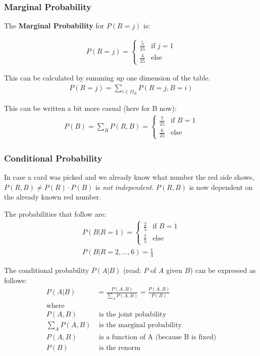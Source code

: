 \subsubsection*{Marginal Probability}
The \textbf{Marginal Probability} for $P(R=j)$ is:

\begin{align*}
P(R=j) = 
\begin{cases} 
\frac{5}{25} & \mbox{if } j = 1 \\ 
\frac{4}{25} & \mbox{else}
\end{cases}
\end{align*}

This can be calculated by summing up one dimension of the table.
\begin{align*}
P(R=j) = \sum\limits_{i \in \Omega_B} P(R=j, B=i)
\end{align*}

This can be written a bit more casual (here for B now):
\begin{align*}
P(B) = \sum\limits_R P(R, B) = 
\begin{cases} 
\frac{7}{25} & \mbox{if } B = 1 \\ 
\frac{6}{25} & \mbox{else}
\end{cases}
\end{align*}

\subsubsection*{Conditional Probability}
In case a card was picked and we already know what number the red side shows,
$P(R, B) \neq P(R) \cdot P(B)$ is \textit{not independent}. $P(R,B)$ is now dependent on the already known red number.

The probabilities that follow are:
\begin{align*}
P(B|R=1) =
\begin{cases} 
\frac{2}{5} & \mbox{if } B = 1 \\ 
\frac{1}{5} & \mbox{else}
\end{cases}\\
P(B|R=2, ..., 6) = \frac{1}{4}
\end{align*}

The conditional probability $P(A|B)$ (read: $P$ of $A$ given $B$) can be expressed as follows:
\begin{align*}
P(A|B)         &= \frac{P(A, B)}{\sum\limits_A P(A, B)} = \frac{P(A, B)}{P(B)} \\
\mbox{where}   & \\
P(A, B)        &\mbox{ is the joint pobability} \\
\sum\limits_A P(A, B) &\mbox{ is the marginal probability} \\
P(A, B)        &\mbox{ is a function of A (because B is fixed)}\\
P(B)           &\mbox{ is the renorm}
\end{align*}


